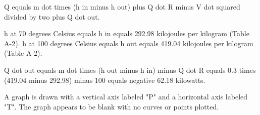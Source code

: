 Q equals m dot times (h in minus h out) plus Q dot R minus V dot squared divided by two plus Q dot out.  

h at 70 degrees Celsius equals h in equals 292.98 kilojoules per kilogram (Table A-2).  
h at 100 degrees Celsius equals h out equals 419.04 kilojoules per kilogram (Table A-2).  

Q dot out equals m dot times (h out minus h in) minus Q dot R equals 0.3 times (419.04 minus 292.98) minus 100 equals negative 62.18 kilowatts.

A graph is drawn with a vertical axis labeled "P" and a horizontal axis labeled "T". The graph appears to be blank with no curves or points plotted.
